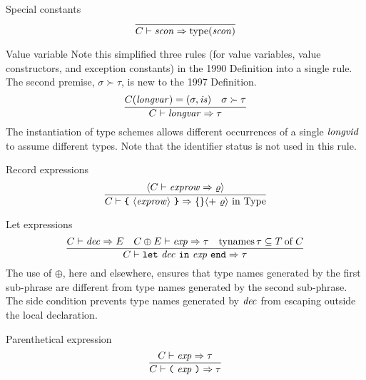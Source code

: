 
\begin{inference-rule}{Special constants}
\begin{equation}\label{rule:static-core:special-constants}
\vcenter{\infer{\C\ts\scon\ra\scontype(\scon)}{}}
\end{equation}
\end{inference-rule}

\begin{inference-rule}{Value variable}
Note this simplified three rules (for value variables, value
constructors, and exception constants) in the 1990 Definition into a single
rule. The second premise, $\sigma\succ\tau$, is new to the 1997 Definition.
\begin{equation}\label{rule:static-core:value-variable}
\vcenter{\infer{\C\ts\longvar\ra\tau}{\C(\longvar)= (\sigma,\is) & \sigma\succ\tau}}
\end{equation}
The instantiation of type schemes allows different occurrences of a
single $\textit{longvid\/}$ to assume different types. Note that the identifier
status is not used in this rule.
\end{inference-rule}

\begin{inference-rule}{Record expressions}
\begin{equation}
\vcenter{\infer{\C\ts\ttlbrace\ \optional{\labexps}\ \ttrbrace\ra\emptymap\optional{+\ \varrho}{\rm\ in\ \Type}}{\optional{\C\ts\labexps\ra\varrho}}}
\end{equation}
\end{inference-rule}

\begin{inference-rule}{Let expressions}
\begin{equation}\label{rule:static-core:let-expression}
  \vcenter{\infer{\C\ts\letexp\ra\tau}%
    {\C\ts\dec\ra\E
      & \C\oplus\E\ts\exp\ra\tau
      & \TyNamesFcn\tau\subseteq\of{\T}{\C}}}
\end{equation}
The use of $\oplus$, here and elsewhere, ensures that
type names generated by the first sub-phrase are different from 
type names generated by the second sub-phrase. The side condition
prevents type names generated by $\textit{dec\/}$ from escaping outside the local declaration.
\end{inference-rule}

\begin{inference-rule}{Parenthetical expression}
\begin{equation}\label{rule:syntax-core:atexp:paren}
\vcenter{\infer{\C\ts\parexp\ra\tau}{\C\ts\exp\ra\tau}}
\end{equation}
\end{inference-rule}

